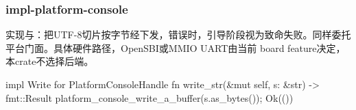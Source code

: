 
\subsubsection{impl-platform-console}

实现与：把UTF-8切片按字节经下发，错误时，引导阶段视为致命失败。同样委托平台门面。具体硬件路径，OpenSBI或MMIO UART由当前 board feature决定，本crate不选择后端。

\begin{rustcode}
impl Write for PlatformConsoleHandle {
    fn write_str(&mut self, s: &str) -> fmt::Result {
        platform_console_write_a_buffer(s.as_bytes());
        Ok(())
    }
}
\end{rustcode}
